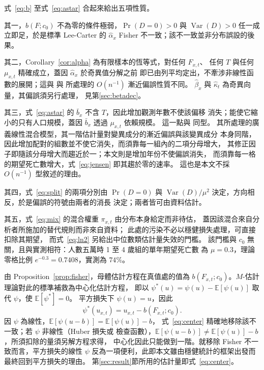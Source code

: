 \documentclass[UTF8, fontset=macnew, a4paper, 12pt]{ctexart}
\newcommand{\Ex}{\mathbb{E}}
\begin{document}
式~\eqref{eq:b} 至式~\eqref{eq:astar} 合起來給出五項性質。

其一，$b(F;c_0)$ 不為零的條件極弱，$\Pr(D=0)>0$ 與
$\operatorname{Var}(D)>0$ 任一成立即足，於是標準 Lee-Carter 的 $\hat\alpha_x$ Fisher
不一致；該不一致並非分布誤設的後果。

其二，Corollary~\ref{cor:alpha} 為有限樣本的恆等式，對任何 $F_{x,t}$、
任何 $T$ 與任何 $\mu_{x,t}$ 精確成立，蓋因 $\hat\alpha_x$ 於奇異值分解之前
即已由列平均定出，不牽涉非線性函數的展開；這與 \citet{coxsnell1968} 與
\citet{firth1993} 所處理的 $O(n^{-1})$ 漸近偏誤性質不同。
$\hat\beta_x$ 與 $\hat\kappa_t$ 為奇異向量，其偏誤須另行處理，
見第\ref{sec:betadec}。

其三，式~\eqref{eq:astar} 的 $\bar b_x$ 不含 $T$，因此增加觀測年數不使該偏移
消失；能使它縮小的只有人口規模，蓋因 $\bar b_x$ 透過 $\mu_{x,t}$ 依賴規模。
這一點與 \citet{breslow1995} 同型。
其所處理的廣義線性混合模型，其一階估計量對變異成分的漸近偏誤與該變異成分
本身同階，因此增加配對的組數並不使它消失，而須靠每一組內的二項分母增大，
其修正因子即隨該分母增大而趨近於一；本文則是增加年份不使偏誤消失，
而須靠每一格的期望死亡數增大，式~\eqref{eq:jensen} 即其趨於零的速率。
這也是本文不採 $O(n^{-1})$ 型敘述的理由。

其四，式~\eqref{eq:split} 的兩項分別由 $\Pr(D=0)$ 與
$\operatorname{Var}(D)/\mu^{2}$ 決定，方向相反，於是偏誤的符號由兩者的消長
決定；兩者皆可由資料估計。

其五，式~\eqref{eq:mix} 的混合權重 $\pi_{x,t}$ 由分布本身給定而非待估，
蓋因該混合來自分析者所施加的替代規則而非來自資料；
此處的污染不必以穩健損失處理，可直接扣除其期望，
而式~\eqref{eq:ln2} 另給出中位數類估計量失效的門檻。
該門檻與 $c_0$ 無關，且與實測相符：人數五萬時 1 至 4 歲組的單年期望死亡數
為 $\mu=0.3$，理論零格比例 $e^{-0.3}=0.7408$，實測為 $74\%$。

由 Proposition~\ref{prop:fisher}，母體估計方程在真值處的值為
$b(F_{x,t};c_0)$。$M$-估計理論對此的標準補救為中心化估計方程，
即以 $\psi^{*}(u)=\psi(u)-\Ex[\psi(u)]$ 取代 $\psi$，使 $\Ex[\psi^{*}]=0$。
平方損失下 $\psi(u)=u$，因此
\begin{equation}\label{eq:center}
\psi^{*}(u_{x,t})=u_{x,t}-b(F_{x,t};c_0) .
\end{equation}
因 $\psi$ 為線性，$\Ex[\psi(u-b)]=\Ex[\psi(u)]-b$，
式~\eqref{eq:center} 精確地移除該不一致；若 $\psi$ 非線性（Huber 損失或
檢查函數），$\Ex[\psi(u-b)]\ne\Ex[\psi(u)]-b$，所須扣除的量須另解方程求得，
中心化因此只能做到一階。就移除 Fisher 不一致而言，平方損失的線性 $\psi$
反為一項便利，此即本文雖由穩健統計的框架出發而最終回到平方損失的理由。
第\ref{sec:result}節所用的估計量即式~\eqref{eq:center}。
\end{document}
